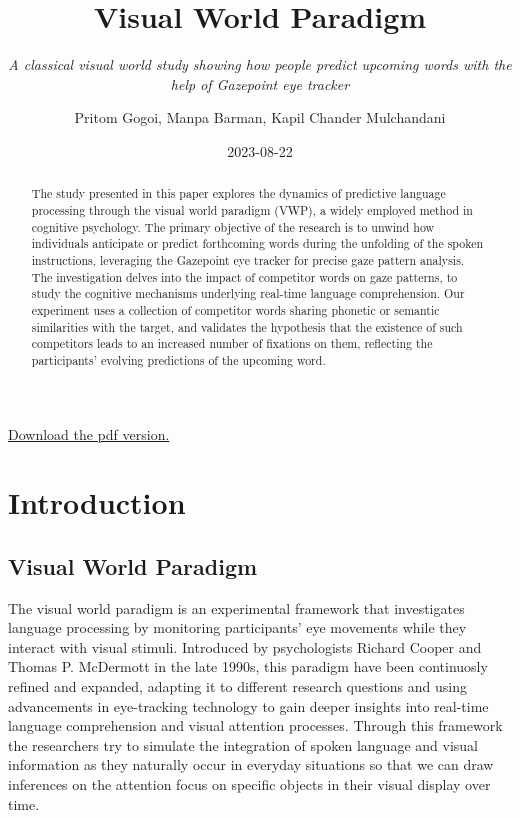 \documentclass[
  a4paper,
]{article}
\title{\textbf{Visual World Paradigm}}
\subtitle{\emph{A classical visual world study showing how people
predict upcoming words with the help of Gazepoint eye tracker}}
\author{Pritom Gogoi, Manpa Barman, Kapil Chander Mulchandani}
\date{2023-08-22}
\renewcommand*\contentsname{Table of contents}
\newcommand\contentsname{Table of contents}
\begin{document}
\maketitle
\begin{abstract}
The study presented in this paper explores the dynamics of predictive
language processing through the visual world paradigm (VWP), a widely
employed method in cognitive psychology. The primary objective of the
research is to unwind how individuals anticipate or predict forthcoming
words during the unfolding of the spoken instructions, leveraging the
Gazepoint eye tracker for precise gaze pattern analysis. The
investigation delves into the impact of competitor words on gaze
patterns, to study the cognitive mechanisms underlying real-time
language comprehension. Our experiment uses a collection of competitor
words sharing phonetic or semantic similarities with the target, and
validates the hypothesis that the existence of such competitors leads to
an increased number of fixations on them, reflecting the participants'
evolving predictions of the upcoming word.
\end{abstract}
\ifdefined\Shaded\renewenvironment{Shaded}{\begin{tcolorbox}[frame hidden, interior hidden, borderline west={3pt}{0pt}{shadecolor}, boxrule=0pt, enhanced, sharp corners, breakable]}{\end{tcolorbox}}\fi

\renewcommand*\contentsname{Table of contents}
{
\hypersetup{linkcolor=}
\setcounter{tocdepth}{3}
\tableofcontents
}
\href{report/docs/report.pdf}{Download the pdf version.}

\hypertarget{introduction}{%
\section{Introduction}\label{introduction}}

\hypertarget{visual-world-paradigm}{%
\subsection{Visual World Paradigm}\label{visual-world-paradigm}}

The visual world paradigm is an experimental framework that investigates
language processing by monitoring participants' eye movements while they
interact with visual stimuli. Introduced by psychologists Richard Cooper
and Thomas P. McDermott in the late 1990s, this paradigm have been
continuosly refined and expanded, adapting it to different research
questions and using advancements in eye-tracking technology to gain
deeper insights into real-time language comprehension and visual
attention processes. Through this framework the researchers try to
simulate the integration of spoken language and visual information as
they naturally occur in everyday situations so that we can draw
inferences on the attention focus on specific objects in their visual
display over time.
\end{document}
